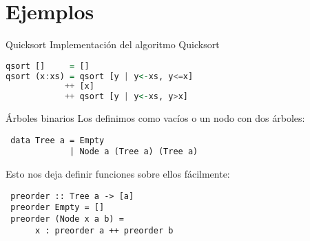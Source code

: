 \section{Ejemplos}

\begin{frame}[fragile]{Quicksort}
  Implementación del algoritmo Quicksort
  \begin{lstlisting}[language=haskell]
qsort []     = []
qsort (x:xs) = qsort [y | y<-xs, y<=x]
            ++ [x]
            ++ qsort [y | y<-xs, y>x]
  \end{lstlisting}
\end{frame}

\begin{frame}[fragile]{Árboles binarios}
  Los definimos como vacíos o un nodo con dos árboles:
  \begin{lstlisting}
 data Tree a = Empty
             | Node a (Tree a) (Tree a)
  \end{lstlisting}

  \espacio

  Esto nos deja definir funciones sobre ellos fácilmente:
  \begin{lstlisting}
 preorder :: Tree a -> [a]
 preorder Empty = []
 preorder (Node x a b) =
      x : preorder a ++ preorder b
  \end{lstlisting}
\end{frame}
